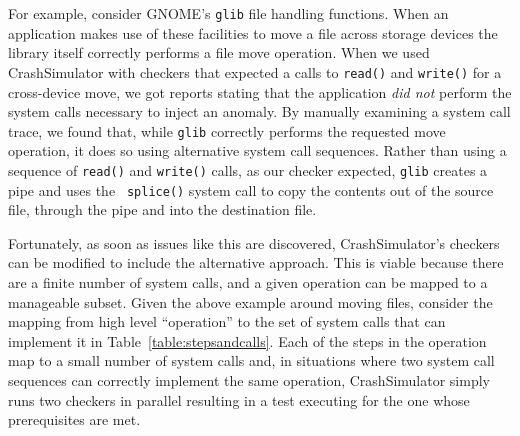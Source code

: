 For example, consider GNOME's {\tt glib} file handling functions.  When an
application makes use of these facilities to move a file across storage
devices the library itself correctly performs a
file move operation.  When we used CrashSimulator with
checkers that expected a calls to {\tt read()} and {\tt write()}
for a cross-device move, we got reports stating that the
application {\em did not} perform the system calls necessary to inject
an anomaly.  By manually
examining a system call trace, we found that, while {\tt glib} correctly
performs the requested move operation,
it does so using alternative system call
sequences.  Rather than using a sequence of {\tt read()} and {\tt write()}
calls, as our checker expected, {\tt glib} creates a pipe and uses the {\tt
splice()} system call to copy the contents out of the source file, through
the pipe and into the destination file.

Fortunately, as soon as issues like this are discovered,
CrashSimulator's checkers can be modified to include the alternative
approach.  This is viable because there
are a finite number of system calls, and a given operation can be mapped to
a manageable subset.  Given the above example around moving
files, consider the mapping from high level ``operation'' to the set of
system calls that can implement it in Table~\ref{table:stepsandcalls}.
Each of the steps in the operation map to a small number of system calls
and,
in
situations where two system call sequences can correctly implement the same
operation, CrashSimulator simply runs two checkers in parallel resulting in a
test executing for the one whose prerequisites are met.

